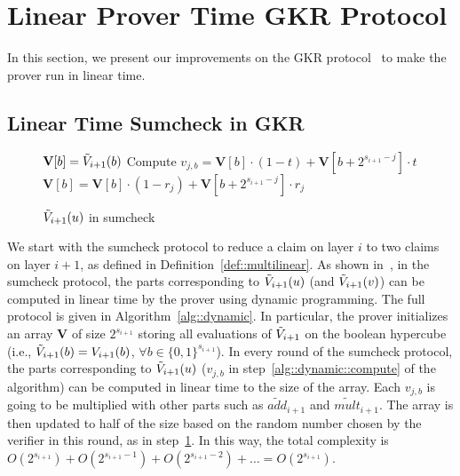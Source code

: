 \section{Linear Prover Time GKR Protocol}
\label{sec::gkrlin}

In this section, we present our improvements on the GKR protocol~\cite{GKR} to make the prover run in linear time. 

\subsection{Linear Time Sumcheck in GKR}


\begin{figure}[ht!]
	\begin{algorithm}[H]
		\caption{$\tilde{V}_{i+1}(u)$ in sumcheck}\label{alg::dynamic}
		\begin{algorithmic}[1]
			\State $\textbf{V}[b] = \tilde{V}_{i+1}(b)$
			\EndFor
			\EndProcedure
			 
			 
					 
					\State\label{alg::dynamic::compute} Compute $v_{j,b} = \textbf{V}[b]\cdot(1-t)+\textbf{V}[b+2^{s_{i+1}-j}]\cdot t$
					\EndFor
				\EndFor
				\State\label{alg::dynamic::update} $\textbf{V}[b]=\textbf{V}[b]\cdot(1-r_j)+\textbf{V}[b+2^{s_{i+1}-j}]\cdot r_j$ 
			\EndFor
			\EndProcedure
		\end{algorithmic}
	\end{algorithm}
\end{figure}

We start with the sumcheck protocol to reduce a claim on layer $i$ to two claims on layer $i+1$, as defined in Definition~\ref{def::multilinear}. As shown in~\cite{CMT}, in the sumcheck protocol, the parts corresponding to $\tilde{V}_{i+1}(u)$ (and $\tilde{V}_{i+1}(v)$) can be computed in linear time by the prover using dynamic programming. The full protocol is given in Algorithm~\ref{alg::dynamic}. In particular, the prover initializes an array $\textbf{V}$ of size $2^{s_{i+1}}$ storing all evaluations of $\tilde{V}_{i+1}$ on the boolean hypercube (i.e., $\tilde{V}_{i+1}(b) = V_{i+1}(b)$, $\forall b\in\{0,1\}^{s_{i+1}}$). In every round of the sumcheck protocol, the parts corresponding to $\tilde{V}_{i+1}(u)$ ($v_{j,b}$ in step~\ref{alg::dynamic::compute} of the algorithm) can be computed in linear time to the size of the array. Each $v_{j,b}$ is going to be multiplied with other parts such as $\tilde{add}_{i+1}$ and $\tilde{mult}_{i+1}$. The array is then updated to half of the size based on the random number chosen by the verifier in this round, as in step~\ref{alg::dynamic::update}. In this way, the total complexity is $O(2^{s_{i+1}})+ O(2^{s_{i+1}-1}) + O(2^{s_{i+1}-2}) + \ldots = O(2^{s_{i+1}})$. 

